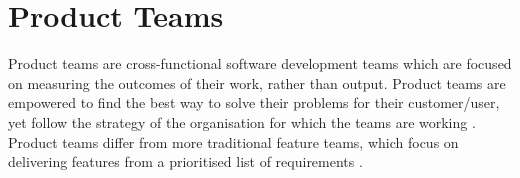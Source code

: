 \section{Product Teams}
Product teams are cross-functional software development teams which are focused on measuring the outcomes of their work, rather than output. Product teams are empowered to find the best way to solve their problems for their customer/user, yet follow the strategy of the organisation for which the teams are working \cite{product_teams_2019}. Product teams differ from more traditional feature teams, which focus on delivering features from a prioritised list of requirements \cite{product_teams_2019}.